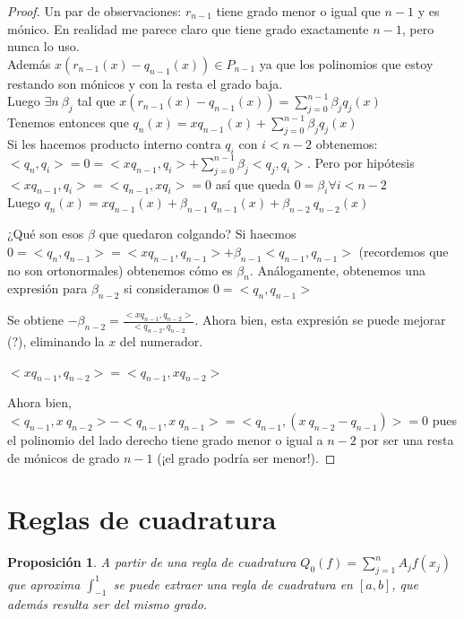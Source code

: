 \documentclass[10pt,a4paper,final]{report}
\newtheorem{proposition}{Proposición}
\begin{document}
{\begin{proof}
Un par de observaciones: $r_{n-1}$ tiene grado menor o igual que $n-1$ y es mónico. En realidad me parece claro que tiene grado exactamente $n-1$, pero nunca lo uso.\\

Además $x (r_{n-1}(x) - q_{n-1}(x)) \in P_{n-1}$ ya que los polinomios que estoy restando son mónicos y con la resta el grado baja.\\

Luego $\exists n\ \beta_j$ tal que $x (r_{n-1}(x) - q_{n-1}(x)) = \displaystyle \sum_{j=0}^{n-1} \beta_j q_j(x)$\\

Tenemos entonces que $q_n(x) = x q_{n-1}(x) + \displaystyle \sum_{j=0}^{n-1} \beta_j q_j(x)$\\

Si les hacemos producto interno contra $q_i$ con $i<n-2$ obtenemos:\\

$<q_n,q_i> = 0 = <x q_{n-1}, q_i> + \displaystyle \sum_{j=0}^{n-1} \beta_j <q_j,q_i>$. Pero por hipótesis $<x q_{n-1}, q_i> = <q_{n-1},x q_i>=0$ así que queda $0 = \beta_i \forall i<n-2$\\

Luego $q_n(x) = x q_{n-1}(x) + \beta_{n-1}\ q_{n-1}(x) + \beta_{n-2}\ q_{n-2}(x)$ 

¿Qué son esos $\beta$ que quedaron colgando?
Si haecmos $0=<q_n,q_{n-1}> = <x q_{n-1}, q_{n-1}> + \beta_{n-1} <q_{n-1},q_{n-1}>$ (recordemos que no son ortonormales) obtenemos cómo es $\beta_n$. Análogamente, obtenemos una expresión para $\beta_{n-2}$ si consideramos $0=<q_n,q_{n-1}>$

Se obtiene $-\beta_{n-2} = \frac{<x q_{n-1}, q_{n-2}>}{<q_{n-2},q_{n-2}}$. Ahora bien, esta expresión se puede mejorar (?), eliminando la $x$ del numerador.

$<x q_{n-1}, q_{n-2}> = <q_{n-1},x q_{n-2}>$

Ahora bien, $<q_{n-1},x\ q_{n-2}> - <q_{n-1},x\ q_{n-1}> = <q_{n-1},(x\ q_{n-2}- q_{n-1})>=0$ pues el polinomio del lado derecho tiene grado menor o igual a $n-2$ por ser una resta de mónicos de grado $n-1$ (¡el grado podría ser menor!).
\end{proof}


\section{Reglas de cuadratura}

\begin{proposition}
A partir de una regla de cuadratura $Q_0(f) = \displaystyle \sum_{j=1}^n A_j f(x_j)$ que aproxima $\int_{-1}^1$ se puede extraer una regla de cuadratura en $[a,b]$, que además resulta ser del mismo grado.


\end{proposition}}
\end{document}
